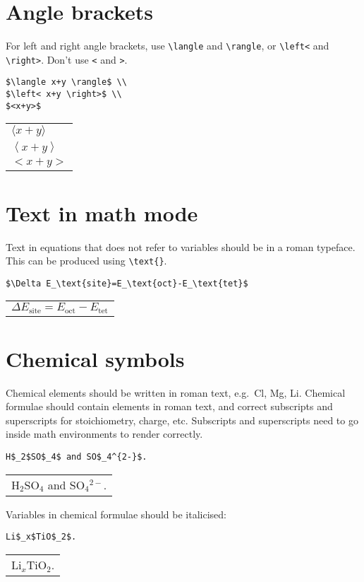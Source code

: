 \documentclass[a4paper]{tufte-handout}
\begin{document}
\section{Angle brackets} 
For left and right angle brackets, use \lstinline{\langle} and \lstinline{\rangle}, or \lstinline$\left<$ and \lstinline$\right>$. Don't use \lstinline{<} and \lstinline{>}.
\begin{lstlisting}
$\langle x+y \rangle$ \\
$\left< x+y \right>$ \\
$<x+y>$
\end{lstlisting}
\begin{tabular}{|p{10cm}}
$\langle x+y \rangle$ \\
$\left< x+y \right>$ \\
$<x+y>$
\end{tabular}

\section{Text in math mode}
Text in equations that does not refer to variables should be in a roman typeface. This can be produced using \lstinline$\text{}$.
\begin{lstlisting}
$\Delta E_\text{site}=E_\text{oct}-E_\text{tet}$
\end{lstlisting}
\begin{tabular}{|p{10cm}}
$\Delta E_\text{site}=E_\text{oct}-E_\text{tet}$
\end{tabular}

\section{Chemical symbols}
Chemical elements should be written in roman text, e.g.\ Cl, Mg, Li.
Chemical formulae should contain elements in roman text, and correct subscripts and superscripts for stoichiometry, charge, etc. Subscripts and superscripts need to go inside math environments to render correctly.
\begin{lstlisting}
H$_2$SO$_4$ and SO$_4^{2-}$.
\end{lstlisting}
\begin{tabular}{|p{10cm}}
H$_2$SO$_4$ and SO$_4$$^{2-}$.
\end{tabular}

Variables in chemical formulae should be italicised:
\begin{lstlisting}
Li$_x$TiO$_2$.
\end{lstlisting}
\begin{tabular}{|p{10cm}}
Li$_x$TiO$_2$.
\end{tabular}
\end{document}
